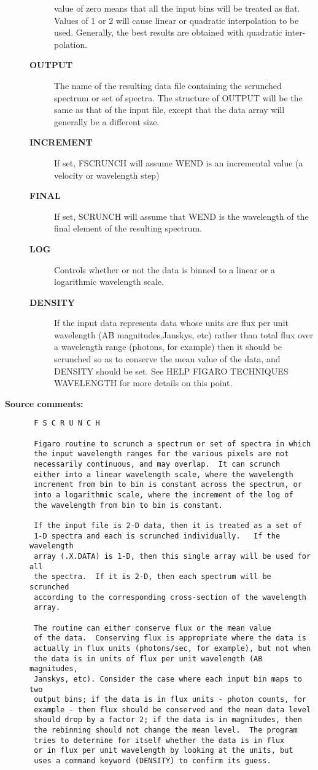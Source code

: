 \begin{description}
\begin{description}
 value of zero means that all the input bins will be
 treated as flat.  Values of 1 or 2 will cause linear
 or quadratic interpolation to be used.  Generally,
 the best results are obtained with quadratic inter-
 polation.
\item [{\bf OUTPUT}]
 The name of the resulting data file containing the
 scrunched spectrum or set of spectra.  The structure
 of OUTPUT will be the same as that of the input file,
 except that the data array will generally be a
 different size.
\item [{\bf INCREMENT}]
 If set, FSCRUNCH will assume WEND is an incremental
 value (a velocity or wavelength step)
\item [{\bf FINAL}]
 If set, SCRUNCH will assume that WEND is the wavelength
 of the final element of the resulting spectrum.
\item [{\bf LOG}]
 Controls whether or not the data is binned to a linear
 or a logarithmic wavelength scale.
\item [{\bf DENSITY}]
 If the input data represents data whose units are flux per
 unit wavelength (AB magnitudes,Janskys, etc) rather than
 total flux over a wavelength range (photons, for example)
 then it should be scrunched so as to conserve the mean
 value of the data, and DENSITY should be set.  See HELP
 FIGARO TECHNIQUES WAVELENGTH for more details on this point.
\end{description}

\item [{\bf Source comments:}]
\begin{verbatim}
 F S C R U N C H

 Figaro routine to scrunch a spectrum or set of spectra in which
 the input wavelength ranges for the various pixels are not
 necessarily continuous, and may overlap.  It can scrunch
 either into a linear wavelength scale, where the wavelength
 increment from bin to bin is constant across the spectrum, or
 into a logarithmic scale, where the increment of the log of
 the wavelength from bin to bin is constant.

 If the input file is 2-D data, then it is treated as a set of
 1-D spectra and each is scrunched individually.   If the wavelength
 array (.X.DATA) is 1-D, then this single array will be used for all
 the spectra.  If it is 2-D, then each spectrum will be scrunched
 according to the corresponding cross-section of the wavelength
 array.

 The routine can either conserve flux or the mean value
 of the data.  Conserving flux is appropriate where the data is
 actually in flux units (photons/sec, for example), but not when
 the data is in units of flux per unit wavelength (AB magnitudes,
 Janskys, etc). Consider the case where each input bin maps to two
 output bins; if the data is in flux units - photon counts, for
 example - then flux should be conserved and the mean data level
 should drop by a factor 2; if the data is in magnitudes, then
 the rebinning should not change the mean level.  The program
 tries to determine for itself whether the data is in flux
 or in flux per unit wavelength by looking at the units, but
 uses a command keyword (DENSITY) to confirm its guess.


\end{verbatim}
\end{description}
